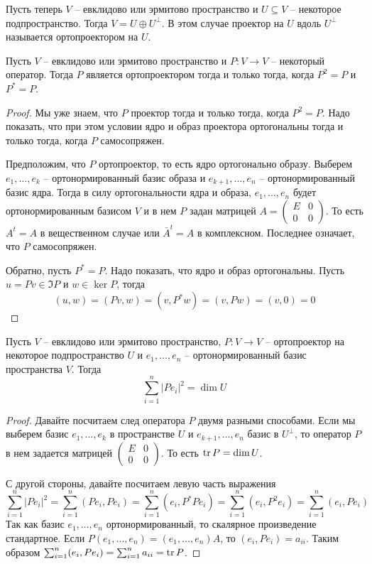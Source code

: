 Пусть теперь $V$ -- евклидово или эрмитово пространство и $U\subseteq V$ -- некоторое подпространство.
Тогда $V = U\oplus U^\bot$.
В этом случае проектор на $U$ вдоль $U^\bot$ называется ортопроектором на $U$.

\begin{claim}
Пусть $V$ -- евклидово или эрмитово пространство и $P\colon V\to V$ -- некоторый оператор.
Тогда $P$ является ортопроектором тогда и только тогда, когда $P^2 = P$ и $P^* = P$.
\end{claim}
\begin{proof}
Мы уже знаем, что $P$ проектор тогда и только тогда, когда $P^2 = P$.
Надо показать, что при этом условии ядро и образ проектора ортогональны тогда и только тогда, когда $P$ самосопряжен.

Предположим, что $P$ ортопроектор, то есть ядро ортогонально образу.
Выберем $e_1,\ldots,e_k$ -- ортонормированный базис образа и $e_{k+1}, \ldots,e_n$ -- ортонормированный базис ядра.
Тогда в силу ортогональности ядра и образа, $e_1,\ldots,e_n$ будет ортонормированным базисом $V$ и в нем $P$ задан матрицей $A=\left(\begin{smallmatrix}{E}&{0}\\{0}&{0}\end{smallmatrix}\right)$.
То есть $A^t = A$ в вещественном случае или $\bar A^t  = A$ в комплексном.
Последнее означает, что $P$ самосопряжен.

Обратно, пусть $P^* = P$.
Надо показать, что ядро и образ ортогональны.
Пусть $u = Pv\in \Im P$ и $w \in \ker P$, тогда
\[
(u, w) = (Pv, w) = (v, P^*w) = (v, Pw) = (v, 0) = 0
\]
\end{proof}

\begin{claim}
Пусть $V$ -- евклидово или эрмитово пространство, $P\colon V\to V$ -- ортопроектор на некоторое подпространство $U$ и $e_1,\ldots,e_n$ -- ортонормированный базис пространства $V$.
Тогда
\[
\sum_{i=1}^n |Pe_i|^2 = \dim U
\]
\end{claim}
\begin{proof}
Давайте посчитаем след оператора $P$ двумя разными способами.
Если мы выберем базис $e_1,\ldots,e_k$ в пространстве $U$ и $e_{k+1}, \ldots,e_n$ базис в $U^\bot$, то оператор $P$ в нем задается матрицей $\left(\begin{smallmatrix}{E}&{0}\\{0}&{0}\end{smallmatrix}\right)$.
То есть $\operatorname{tr} P = \dim U$.

С другой стороны, давайте посчитаем левую часть выражения
\[
\sum_{i=1}^n |Pe_i|^2 = \sum_{i=1}^n (Pe_i, Pe_i) = \sum_{i=1}^n (e_i, P^*Pe_i) = \sum_{i=1}^n (e_i, P^2e_i) = \sum_{i=1}^n (e_i, Pe_i)
\]
Так как базис $e_1,\ldots,e_n$ ортонормированный, то скалярное произведение стандартное.
Если $P(e_1,\ldots,e_n) = (e_1,\ldots,e_n)A$, то $(e_i, Pe_i) = a_{ii}$.
Таким образом $ \sum_{i=1}^n (e_i, Pe_i) = \sum_{i=1}^na_{ii} = \operatorname{tr} P$.
\end{proof}

